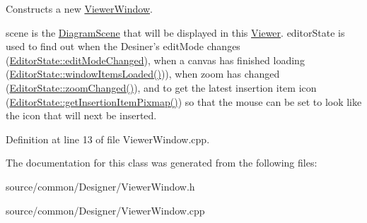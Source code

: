 Constructs a new \hyperlink{class_viewer_window}{Viewer\-Window}. 

scene is the \hyperlink{class_diagram_scene}{Diagram\-Scene} that will be displayed in this \hyperlink{class_viewer}{Viewer}. editor\-State is used to find out when the Desiner's edit\-Mode changes (\hyperlink{class_editor_state_ac654abb4fb812ab6c010eb91ca25ecf2}{Editor\-State\-::edit\-Mode\-Changed}), when a canvas has finished loading (\hyperlink{class_editor_state_ac20a26572d858576503acda7d7c7231f}{Editor\-State\-::window\-Items\-Loaded()})), when zoom has changed (\hyperlink{class_editor_state_af5b7818287993dcab74199b4f71593e3}{Editor\-State\-::zoom\-Changed()}), and to get the latest insertion item icon (\hyperlink{class_editor_state_a054a40b7782f1810c8f0dd349a536efc}{Editor\-State\-::get\-Insertion\-Item\-Pixmap()}) so that the mouse can be set to look like the icon that will next be inserted. 

Definition at line 13 of file Viewer\-Window.\-cpp.



The documentation for this class was generated from the following files\-:\begin{DoxyCompactItemize}
\item 
source/common/\-Designer/Viewer\-Window.\-h\item 
source/common/\-Designer/Viewer\-Window.\-cpp\end{DoxyCompactItemize}
